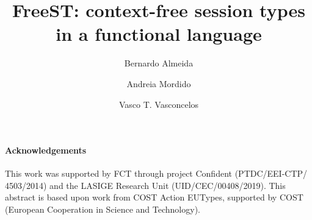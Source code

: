 \documentclass[submission,copyright,creativecommons]{eptcs}
\title{FreeST: context-free session types in a functional language}
\author{
  Bernardo Almeida
  \and
  Andreia Mordido
  \and
  Vasco T. Vasconcelos
  \institute{LASIGE, Faculdade de Ciências, Universidade de Lisboa, Portugal}
}
\begin{document}
\maketitle








\paragraph{Acknowledgements} This work was supported by FCT through
project Confident (PTDC/EEI-CTP/ 4503/2014) and the LASIGE Research
Unit (UID/CEC/00408/2019). This abstract is based upon work 
from COST Action EUTypes, supported by COST (European Cooperation 
in Science and Technology).




\appendix

\end{document}
